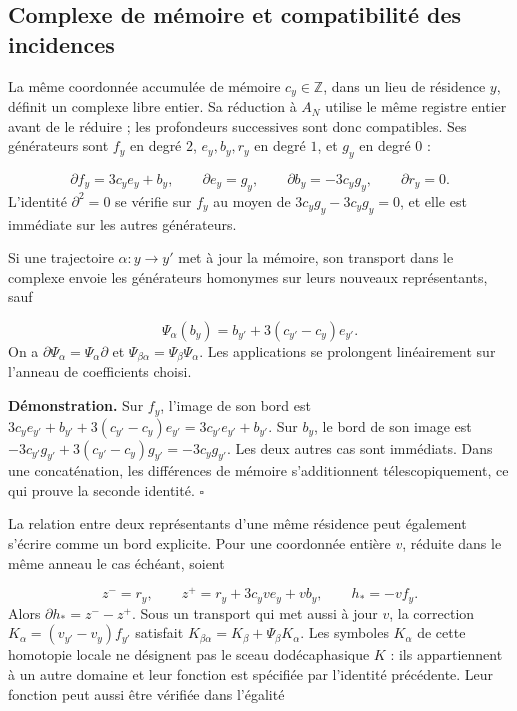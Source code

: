 \subsection{Complexe de mémoire et compatibilité des incidences}
La même coordonnée accumulée de mémoire \(c_y\in\mathbb Z\), dans un lieu de résidence \(y\), définit un complexe libre entier. Sa réduction à \(A_N\) utilise le même registre entier avant de le réduire ; les profondeurs successives sont donc compatibles. Ses générateurs sont \(f_y\) en degré \(2\), \(e_y,b_y,r_y\) en degré \(1\), et \(g_y\) en degré \(0\) :

\[
\partial f_y=3c_y e_y+b_y,\qquad
\partial e_y=g_y,\qquad
\partial b_y=-3c_y g_y,\qquad
\partial r_y=0.
\]
L'identité \(\partial^2=0\) se vérifie sur \(f_y\) au moyen de \(3c_yg_y-3c_yg_y=0\), et elle est immédiate sur les autres générateurs.

Si une trajectoire \(\alpha:y\to y'\) met à jour la mémoire, son transport dans le complexe envoie les générateurs homonymes sur leurs nouveaux représentants, sauf

\[
\Psi_\alpha(b_y)=b_{y'}+3(c_{y'}-c_y)e_{y'}.
\]
On a \(\partial\Psi_\alpha=\Psi_\alpha\partial\) et \(\Psi_{\beta\alpha}=\Psi_\beta\Psi_\alpha\). Les applications se prolongent linéairement sur l'anneau de coefficients choisi.

\textbf{Démonstration.} Sur \(f_y\), l'image de son bord est \(3c_ye_{y'}+b_{y'}+3(c_{y'}-c_y)e_{y'} =3c_{y'}e_{y'}+b_{y'}\). Sur \(b_y\), le bord de son image est \(-3c_{y'}g_{y'}+3(c_{y'}-c_y)g_{y'}=-3c_yg_{y'}\). Les deux autres cas sont immédiats. Dans une concaténation, les différences de mémoire s'additionnent télescopiquement, ce qui prouve la seconde identité. \hfill\(\square\)

La relation entre deux représentants d'une même résidence peut également s'écrire comme un bord explicite. Pour une coordonnée entière \(v\), réduite dans le même anneau le cas échéant, soient

\[
z^-=r_y,\qquad z^+=r_y+3c_yv e_y+v b_y,
\qquad h_*=-vf_y.
\]
Alors \(\partial h_*=z^--z^+\). Sous un transport qui met aussi à jour \(v\), la correction \(K_\alpha=(v_{y'}-v_y)f_{y'}\) satisfait \(K_{\beta\alpha}=K_\beta+\Psi_\beta K_\alpha\). Les symboles \(K_\alpha\) de cette homotopie locale ne désignent pas le sceau dodécaphasique \(K\) : ils appartiennent à un autre domaine et leur fonction est spécifiée par l'identité précédente. Leur fonction peut aussi être vérifiée dans l'égalité

